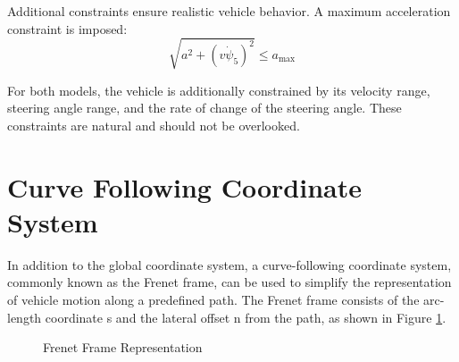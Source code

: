 Additional constraints ensure realistic vehicle behavior.
A maximum acceleration
constraint is imposed:
\begin{equation}
	\label{eq:friction_constraint}
	\sqrt{a^2 + (v\dot{\psi}_5)^2} \leq a_{\max}
\end{equation}

For both models, the vehicle is additionally constrained by its velocity range, steering angle range, and the rate of change of the steering angle.
These constraints are natural and should not be overlooked.

\section{Curve Following Coordinate System} \label{subsec:curve_following_coordinate_system}

In addition to the global coordinate system, a curve-following coordinate system, commonly known as the Frenet frame, can be used to simplify the
representation of vehicle motion along a predefined path.
The Frenet frame consists of the arc-length coordinate s and the lateral offset n from the path, as shown in Figure \ref{fig:frenet_frame}.

\begin{figure}[h]
	\centering
	\caption{Frenet Frame Representation}
	\label{fig:frenet_frame}
\end{figure}